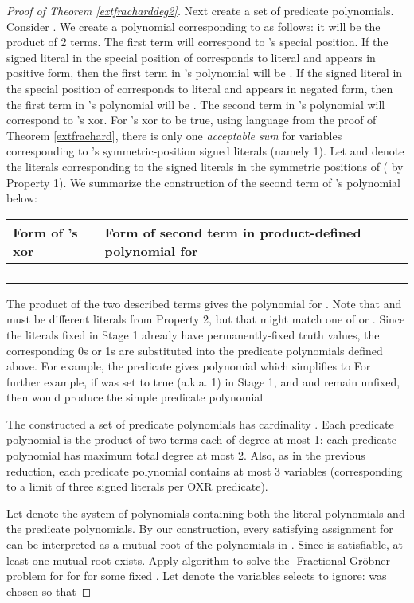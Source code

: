 \documentclass{article}
\begin{document}
\begin{proof}[Proof of Theorem \ref{extfracharddeg2}]
Next create a set of predicate polynomials. Consider .
We create a polynomial corresponding to  as follows: it will be the product of 2 terms.  The first term will correspond to 's special position. If the signed literal in the special position of  corresponds to literal  and appears in positive form, then the first term in 's polynomial will be . If the signed literal in the special position of  corresponds to literal  and appears in negated form, then the first term in 's polynomial will be . The second term in 's polynomial will correspond to 's xor.  For 's xor to be true, using language from the proof of Theorem \ref{extfrachard}, there is only one \textit{acceptable sum} for variables corresponding to 's symmetric-position signed literals (namely 1). Let  and  denote the literals corresponding to the signed literals in the symmetric positions of  ( by Property 1).  We summarize the construction of the second term of 's polynomial below:\\

\begin{tabular}{l|l}
Form of 's xor & Form of second term in product-defined polynomial for \\ \hline
 &  \\
 &  \\
 &  \\
 & \\
\end{tabular}

\vspace{2mm}
The product of the two described terms gives the polynomial for . Note that  and  must be different literals from Property 2, but that  might match one of  or .  Since the literals fixed in Stage 1 already have permanently-fixed truth values, the corresponding 0s or 1s are substituted into the predicate polynomials defined above.  
For example, the predicate  gives polynomial  which simplifies to 
For further example, if  was set to true (a.k.a. 1) in Stage 1, and  and  remain unfixed, then  would produce the simple predicate polynomial 

The constructed a set of predicate polynomials has cardinality .
Each predicate polynomial is the product of two terms each of degree at most 1: each predicate polynomial has maximum total degree at most 2. Also, as in the previous reduction, each predicate polynomial contains at most 3 variables (corresponding to a limit of three signed literals per OXR predicate).

Let  denote the system of polynomials containing both the literal polynomials and the predicate polynomials. By our construction, every satisfying assignment for  can be interpreted as a mutual root of the polynomials in . 
Since  is satisfiable, at least one mutual root exists. Apply algorithm  to solve the \nobreakdash-Fractional Gr\"{o}bner problem for  for  for some fixed . Let  denote the variables  selects to ignore:  was chosen so that


\end{proof}
\end{document}
